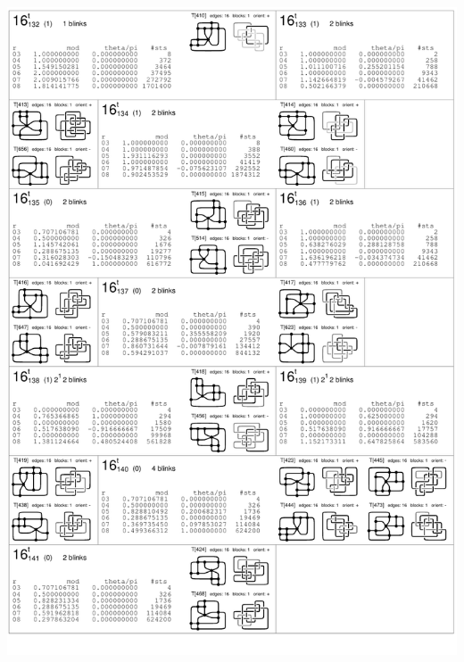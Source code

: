 \begin{center}
 \includegraphics[height=23.5cm]{E.figsbw2/con3catalog028_bw.pdf} \eject 

\end{center}
